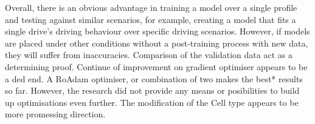 %
%
%
%
%
%
%
%
%
%
%
%
% 
%
%
Overall, there is an obvious advantage in training a model over a single profile and testing against similar scenarios, for example, creating a model that fits a single drive's driving behaviour over specific driving scenarios.
However, if models are placed under other conditions without a post-training process with new data, they will suffer from inaccuracies.
Comparison of the validation data act as a determining proof.
%
Continue of improvement on gradient optimiser appears to be a ded end. A RoAdam optimiser, or combination of two makes the best* results so far. However, the research did not provide any means or posibilities to build up optimisations even further.
The modification of the Cell type appears to be more promessing direction.